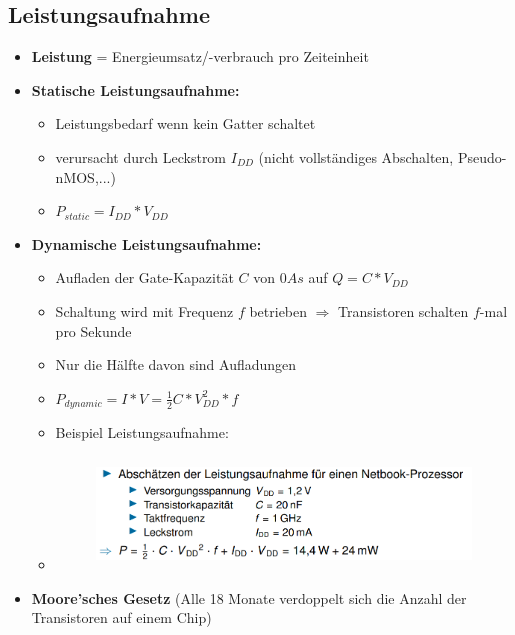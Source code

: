 \documentclass[11pt,a4paper]{article}
\begin{document}
\subsection{Leistungsaufnahme}
\begin{itemize}
\item \textbf{Leistung} = Energieumsatz/-verbrauch pro Zeiteinheit

\item \textbf{Statische Leistungsaufnahme:} 
	\begin{itemize}
	\item Leistungsbedarf wenn kein Gatter schaltet
	\item verursacht durch Leckstrom $I_{DD}$ (nicht vollständiges Abschalten, Pseudo-nMOS,...)
	\item $P_{static} = I_{DD} * V_{DD}$
	\end{itemize}

\item \textbf{Dynamische Leistungsaufnahme:} 
	\begin{itemize}
	\item Aufladen der Gate-Kapazität $C$ von $0 As$ auf $Q = C * V_{DD}$
	\item Schaltung wird mit Frequenz $f$ betrieben $\Rightarrow$ Transistoren schalten $f$-mal pro Sekunde
	\item Nur die Hälfte davon sind Aufladungen
	\item $P_{dynamic} = I * V = \frac{1}{2} C*V_{DD}^2*f$
	\item Beispiel Leistungsaufnahme:
	\item[]	\vspace{-0.35cm}
			\begin{figure}[H]
				\begin{center}
				\includegraphics[height=3cm]{Bilder/bspleistung}
				\end{center}
			\end{figure}
	\end{itemize}
	
\item \textbf{Moore'sches Gesetz} (Alle 18 Monate verdoppelt sich die Anzahl der Transistoren auf einem Chip)
	
	
\end{itemize}
\end{document}
